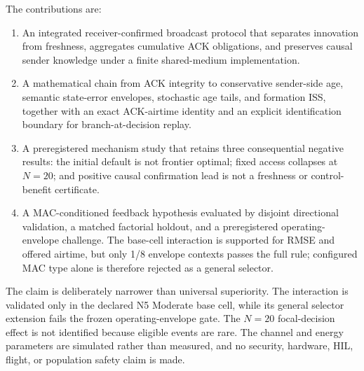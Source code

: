 The contributions are:

\begin{enumerate}
\item An integrated receiver-confirmed broadcast protocol that separates innovation from
freshness, aggregates cumulative ACK obligations, and preserves causal
sender knowledge under a finite shared-medium implementation.

\item A mathematical chain from ACK integrity to conservative sender-side
age, semantic state-error envelopes, stochastic age tails, and formation ISS,
together with an exact ACK-airtime identity and an explicit identification
boundary for branch-at-decision replay.

\item A preregistered mechanism study that retains three consequential
negative results: the initial default is not frontier optimal; fixed access
collapses at $N=20$; and positive causal confirmation lead is not a freshness
or control-benefit certificate.

\item A MAC-conditioned feedback hypothesis evaluated by disjoint directional
validation, a matched factorial holdout, and a preregistered operating-envelope
challenge. The base-cell interaction is supported for RMSE and offered airtime,
but only 1/8 envelope contexts passes the full rule; configured MAC type alone
is therefore rejected as a general selector.
\end{enumerate}

The claim is deliberately narrower than universal superiority. The interaction
is validated only in the declared N5 Moderate base cell, while its general
selector extension fails the frozen operating-envelope gate.
The $N=20$ focal-decision
effect is not identified because eligible events are rare. The channel and
energy parameters are simulated rather than measured, and no security,
hardware, HIL, flight, or population safety claim is made.

